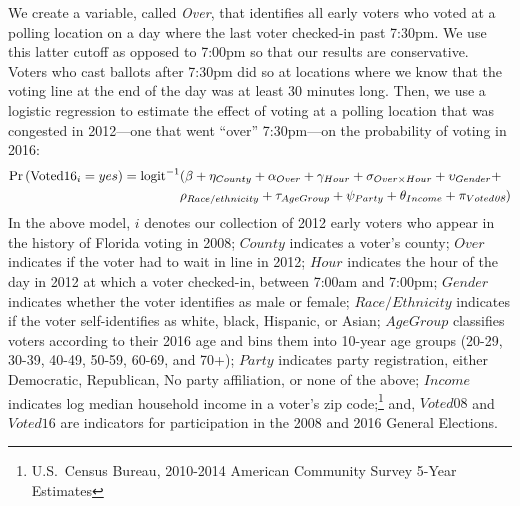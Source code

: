 \documentclass[12pt,titlepage]{article}
\begin{document}
 
We create a variable, called \emph{Over}, that identifies all early
voters who voted at a polling location on a day where the last voter
checked-in past 7:30pm. We use this latter cutoff as opposed to 7:00pm
so that our results are conservative. Voters who cast ballots after
7:30pm did so at locations where we know that the voting line at the
end of the day was at least 30 minutes long. Then, we use a logistic
regression to estimate the effect of voting at a polling location that
was congested in 2012---one that went ``over'' 7:30pm---on the
probability of voting in 2016: \begin{equation*}
  \begin{aligned}
    \textup{Pr}\left(\mathrm{Voted16}_{i} = yes\right) =
    \textup{logit}^{-1}&(\beta + \eta_{County} + \alpha_{Over} + \gamma_{Hour} +
    \sigma_{Over \times Hour} + \upsilon_{Gender}  + \\& \rho_{Race/ethnicity} +
      \tau_{Age Group} + \psi_{Party} + \theta_{Income} + \pi_{Voted\emph{08}})
  \end{aligned}  
\end{equation*}
%
In the above model, $i$ denotes our collection of 2012 early voters
who appear in the history of Florida voting in 2008; $County$
indicates a voter's county; $Over$ indicates if the voter had to wait
in line in 2012; $Hour$ indicates the hour of the day in 2012 at which
a voter checked-in, between 7:00am and 7:00pm; $Gender$ indicates
whether the voter identifies as male or female; $Race/Ethnicity$
indicates if the voter self-identifies as white, black, Hispanic, or
Asian; $Age Group$ classifies voters according to their 2016 age and
bins them into 10-year age groups (20-29, 30-39, 40-49, 50-59, 60-69,
and 70+); $Party$ indicates party registration, either Democratic,
Republican, No party affiliation, or none of the above; $Income$
indicates log median household income in a voter's zip
code;\footnote{U.S.\ Census Bureau, 2010-2014 American Community
  Survey 5-Year Estimates} and, $Voted08$ and $Voted16$ are indicators
for participation in the 2008 and 2016 General Elections.
\end{document}
